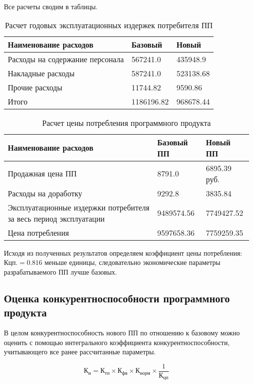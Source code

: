 \begin{par}
Все расчеты сводим в таблицы.
\begin{table}[H]
\caption{Расчет годовых эксплуатационных издержек потребителя ПП}
\begin{tabular}{|p{8cm}|p{4cm}|p{3.5cm}|}
\hline{}
Наименование расходов & Базовый & Новый \\
\hline{}
Расходы на содержание персонала & 567241.0 & 435948.9\\
\hline{}
Накладные расходы & 587241.0 & 523138.68\\
\hline{}
Прочие расходы & 11744.82 & 9590.86 \\
\hline{}
Итого & 1186196.82 & 968678.44 \\
\hline
\end{tabular}
\label{table:yearEkspIzd}
\end{table}

\begin{table}[H]
\caption{Расчет цены потребления программного продукта}
\begin{tabular}{|p{8cm}|p{4cm}|p{3.5cm}|}
\hline{}
Наименование расходов &  Базовый ПП & Новый ПП \\
\hline{}
Продажная цена ПП &  8791.0 & 6895.39 руб. \\
\hline{}
Расходы на доработку & 9292.8 & 3835.84 \\
\hline{}
Эксплуатационные издержки потребителя за весь период эксплуатации & 9489574.56 & 7749427.52 \\
\hline{}
Цена потребления & 9597658.36 & 7759259.35\\
\hline
\end{tabular}
\label{table:zhenaPotreblenija}
\end{table}
\end{par}

Исходя из полученных результатов определяем коэффициент цены потребления: $Кцп.=0.816$ меньше единицы,
следовательно экономические параметры разрабатываемого ПП лучше базовых.

\subsection{Оценка конкурентноспособности программного продукта}
В целом конкурентноспособность нового ПП по отношению к базовому можно оценить с помощью интегрального
коэффициента конкурентноспособности, учитывающего все ранее рассчитанные параметры.

\begin{equation}
К_{и} = К_{тп} \times{} К_{фв} \times{} К_{норм} \times{} \frac{1}{К_{цп}}
\end{equation}

